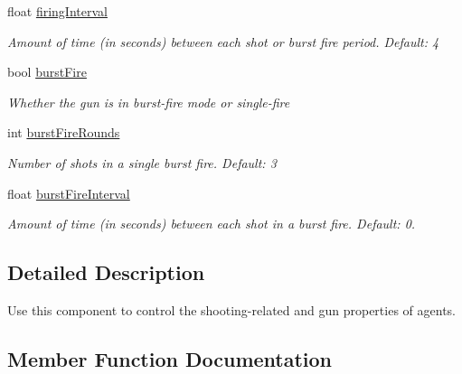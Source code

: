 \begin{DoxyCompactItemize}
float \mbox{\hyperlink{class_lua_1_1_shooting_aece1867c834c0c4fc31af53c55c8040e}{firing\+Interval}}
\begin{DoxyCompactList}\small\item\em Amount of time (in seconds) between each shot or burst fire period. Default\+: 4 \end{DoxyCompactList}\item 
bool \mbox{\hyperlink{class_lua_1_1_shooting_a6ddbbd79abebeb560511e7c00093fb1a}{burst\+Fire}}
\begin{DoxyCompactList}\small\item\em Whether the gun is in burst-\/fire mode or single-\/fire \end{DoxyCompactList}\item 
int \mbox{\hyperlink{class_lua_1_1_shooting_a41ac94c6ba5c407bd0fcbf0f6e938fd1}{burst\+Fire\+Rounds}}
\begin{DoxyCompactList}\small\item\em Number of shots in a single burst fire. Default\+: 3 \end{DoxyCompactList}\item 
float \mbox{\hyperlink{class_lua_1_1_shooting_a51b27960d8f74262edb79dc173f75670}{burst\+Fire\+Interval}}
\begin{DoxyCompactList}\small\item\em Amount of time (in seconds) between each shot in a burst fire. Default\+: 0. \end{DoxyCompactList}\end{DoxyCompactItemize}


\subsection{Detailed Description}
Use this component to control the shooting-\/related and gun properties of agents. 



\subsection{Member Function Documentation}
\mbox{\label{class_lua_1_1_shooting_a8bd9055060bba675e803483c5a1f71d2}} 
